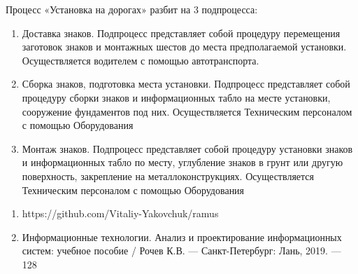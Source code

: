 \documentclass[a4paper,14pt]{extarticle}
\begin{document}
Процесс «Установка на дорогах» разбит на 3 подпроцесса:
\begin{enumerate}
	\item Доставка знаков. Подпроцесс представляет собой процедуру перемещения заготовок знаков и монтажных шестов до места предполагаемой установки. Осуществляется водителем с помощью автотранспорта.
	\item Сборка знаков, подготовка места установки. Подпроцесс представляет собой процедуру сборки знаков и информационных табло на месте установки, сооружение фундаментов под них. Осуществляется Техническим персоналом с помощью Оборудования 
	\item Монтаж знаков. Подпроцесс представляет собой процедуру установки знаков и информационных табло по месту, углубление знаков в грунт или другую поверхность, закрепление на металлоконструкциях. Осуществляется Техническим персоналом с помощью Оборудования 
\end{enumerate}


\begin{enumerate}
	\item https://github.com/Vitaliy-Yakovchuk/ramus
	\item Информационные технологии. Анализ и проектирование информационных систем: учебное пособие / Рочев К.В. --- Санкт-Петербург: Лань, 2019. --- 128
\end{enumerate}


\end{document}

